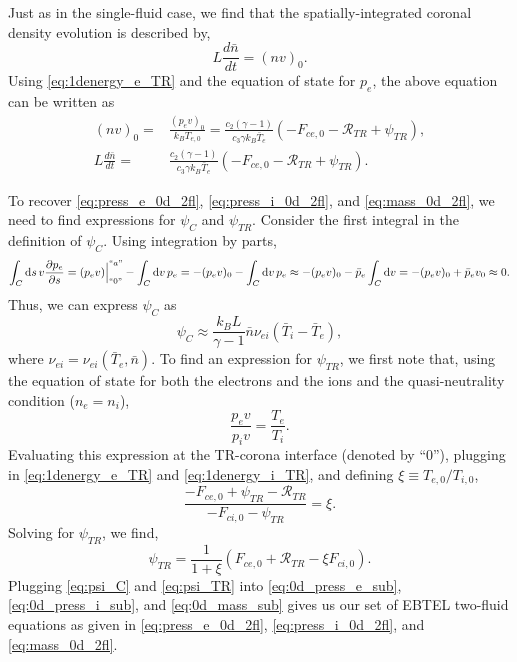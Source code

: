 \documentclass[apj]{emulateapj}
\begin{document}
	\par Just as in the single-fluid case, we find that the spatially-integrated coronal density evolution is described by,
	\begin{equation}
		L\frac{d\bar{n}}{dt} = (nv)_0.
	\end{equation}
	Using \autoref{eq:1denergy_e_TR} and the equation of state for $p_e$, the above equation can be written as
	\begin{align}
		(nv)_0 =& \frac{(p_ev)_0}{k_BT_{e,0}} = \frac{c_2(\gamma - 1)}{c_3\gamma k_B\bar{T}_e}(-F_{ce,0} - \mathcal{R}_{TR} + \psi_{TR}),\\
		L\frac{d\bar{n}}{dt} =& \frac{c_2(\gamma - 1)}{c_3\gamma k_B\bar{T}_e}(-F_{ce,0} - \mathcal{R}_{TR} + \psi_{TR}).\label{eq:0d_mass_sub}
	\end{align}
	\par To recover \autoref{eq:press_e_0d_2fl}, \autoref{eq:press_i_0d_2fl}, and \autoref{eq:mass_0d_2fl}, we need to find expressions for $\psi_C$ and $\psi_{TR}$. Consider the first integral in the definition of $\psi_C$. Using integration by parts,
	\begin{equation}
		\int_C\mathrm{d}s\,v\frac{\partial p_e}{\partial s} = (p_ev)\Big|^{``a"}_{``0"} - \int_C\mathrm{d}v\,p_e = -(p_ev)_0 - \int_C\mathrm{d}v\,p_e\approx -(p_ev)_0 -\bar{p}_e\int_C\mathrm{d}v = -(p_ev)_0 + \bar{p}_ev_0 \approx 0.
	\end{equation}
	Thus, we can express $\psi_C$ as 
	\begin{equation}
		\psi_C\approx\frac{k_BL}{\gamma -1}\bar{n}\nu_{ei}(\bar{T}_i - \bar{T}_e),
		\label{eq:psi_C}
	\end{equation}
	where $\nu_{ei}=\nu_{ei}(\bar{T}_e,\bar{n})$. To find an expression for $\psi_{TR}$, we first note that, using the equation of state for both the electrons and the ions and the quasi-neutrality condition ($n_e=n_i$), 
	\begin{equation}
		\frac{p_ev}{p_iv} = \frac{T_e}{T_i}.
	\end{equation}
	Evaluating this expression at the TR-corona interface (denoted by ``0''), plugging in \autoref{eq:1denergy_e_TR} and \autoref{eq:1denergy_i_TR}, and defining $\xi\equiv T_{e,0}/T_{i,0}$,
	\begin{equation}
		\frac{- F_{ce,0} + \psi_{TR} - \mathcal{R}_{TR}}{- F_{ci,0} - \psi_{TR}} = \xi.
	\end{equation}
	Solving for $\psi_{TR}$, we find,
	\begin{equation}
		\psi_{TR} = \frac{1}{1+\xi}(F_{ce,0} + \mathcal{R}_{TR} - \xi F_{ci,0}).
		\label{eq:psi_TR}
	\end{equation}
	Plugging \autoref{eq:psi_C} and \autoref{eq:psi_TR} into \autoref{eq:0d_press_e_sub}, \autoref{eq:0d_press_i_sub}, and \autoref{eq:0d_mass_sub} gives us our set of EBTEL two-fluid equations as given in \autoref{eq:press_e_0d_2fl}, \autoref{eq:press_i_0d_2fl}, and \autoref{eq:mass_0d_2fl}.
	
	
	\clearpage
\end{document}
